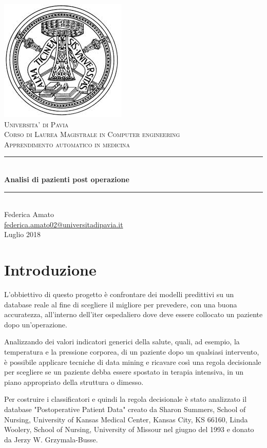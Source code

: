 \documentclass[a4paper, 12p]{report}
\begin{document}
\begin{titlepage}
	\centering
	\includegraphics[scale = 0.4]{img/logo.jpeg}\\[1.0 cm]
	\textsc{\LARGE Universita' di Pavia}\\[1.0 cm]
	\textsc{\LARGE Corso di Laurea Magistrale in Computer engineering}\\[1 cm]
	\textsc{\Large Apprendimento automatico in medicina}\\[0.5 cm]
	\rule{\linewidth}{0.2 mm} \\[0.4 cm]
	{\huge{\textbf{Analisi di pazienti post operazione}}}\\
	\rule{\linewidth}{0.2 mm} \\[1 cm]

	{\large Federica Amato} \\[0.2 cm]
	\url{federica.amato02@universitadipavia.it}
	 \\[0.2 cm]
	{Luglio 2018}
\end{titlepage}

\tableofcontents
\chapter{Introduzione}
L'obbiettivo di questo progetto è confrontare dei modelli predittivi su un database reale al fine di scegliere il migliore per prevedere, con una buona accuratezza, all'interno dell'iter ospedaliero dove deve essere collocato un paziente dopo un'operazione. 

\noindent Analizzando dei valori indicatori generici della salute, quali, ad esempio, la temperatura e la pressione corporea, di un paziente dopo un qualsiasi intervento, è possibile applicare tecniche di data mining e ricavare così una regola decisionale per scegliere se un paziente debba essere spostato in terapia intensiva, in un piano appropriato della struttura o dimesso.

\noindent Per costruire i classificatori e quindi la regola decisionale è stato analizzato il database "Postoperative Patient Data" creato da Sharon Summers, School of Nursing, University of Kansas Medical Center, Kansas City, KS 66160, Linda Woolery, School of Nursing, University of Missour nel giugno del 1993 e donato  da Jerzy W. Grzymala-Busse. 
\end{document}
